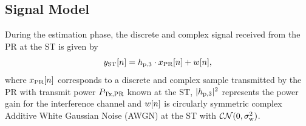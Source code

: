 
\subsection{Signal Model}
During the estimation phase, the discrete and complex signal received from the PR at the ST is given by
\begin{equation}
y_{\text{ST}}[n] = h_{\text{p,3}} \cdot x_{\text{PR}}[n] + w[n],
\label{eq:sys_mod_st}
\end{equation}
where $x_{\text{PR}}[n]$ corresponds to a discrete and complex sample transmitted by the PR with transmit power $P_{\text{Tx,PR}}$ known at the ST, $|h_{\text{p,3}}|^2$ represents the power gain for the interference channel and $w[n]$ is circularly symmetric complex Additive White Gaussian Noise (AWGN) at the ST with %
$\mathcal{CN}(0, \sigma^2_{\text{w}})$. %

